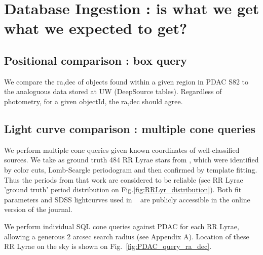 \documentclass[fleqn,usenatbib]{mnras} %
\begin{document}


\section{Database Ingestion : is what we get what we expected to get? }
\label{sec:dg}


\subsection{Positional comparison : box query }

We compare the ra,dec of objects found within  a given region in PDAC S82 to the analoguous data stored at UW (DeepSource tables). Regardless of photometry, for a given objectId, the ra,dec should agree.  


\subsection{Light curve comparison : multiple cone queries }
\label{sec:rr_lyrae}

We perform multiple cone queries given known coordinates of well-classified sources.  We take as ground truth  484 RR Lyrae stars from   \cite{sesar2010} , which were identified by color cuts, Lomb-Scargle periodogram and then confirmed by template fitting.  Thus the periods from that work are considered to be reliable (see  RR Lyrae 'ground truth'  period distribution on Fig.\ref{fig:RRLyr_distribution}). Both fit parameters and  SDSS lightcurves used in ~\cite{sesar2010}  are publicly accessible in the online version of the journal.

We perform individual SQL  cone queries  against PDAC for each RR Lyrae, allowing a generous 2 arcsec search radius (see Appendix A). Location of these RR Lyrae on the sky is shown on Fig.~\ref{fig:PDAC_query_ra_dec}. 
\end{document}
